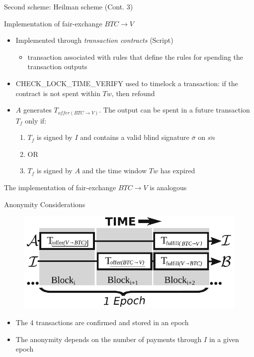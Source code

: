 \documentclass{beamer}
\begin{document}
  
  
  \begin{frame}{Second scheme: Heilman scheme (Cont. 3)}
      \begin{block}{Implementation of fair-exchange $BTC\rightarrow V$}
        \begin{itemize}
            \item Implemented through \emph{transaction contracts} (Script)
            \begin{itemize}
                \item[\MVRightarrow] transaction associated with rules that define the rules for spending the transaction outputs
            \end{itemize}
            \item CHECK\_LOCK\_TIME\_VERIFY used to timelock a transaction: if the contract is not spent within $Tw$, then refound 
            \item $A$ generates $T_{offer(BTC\rightarrow V)}$. The output can be spent in a future transaction $T_f$ only if:
            \begin{enumerate}
                \item $T_f$ is signed by $I$ and contains a valid blind signature $\overline\sigma$ on $\overline{sn}$
                \item[] OR 
                \item $T_f$ is signed by $A$ and the time window $Tw$ has expired
            \end{enumerate}
        \end{itemize}
      \end{block}
      \pause
      
      The implementation of fair-exchange $BTC\rightarrow V$ is analogous
  \end{frame}
  
  
  
  
  
  \begin{frame}{Anonymity Considerations}
      \begin{figure}
          \centering
          \includegraphics[width=0.4\linewidth]{../img/epochs.png}
      \end{figure}
      \begin{itemize}
          \item The 4 transactions are confirmed and stored in an epoch
          \item The anonymity depends on the number of payments through $I$ in a given epoch
      \end{itemize}
  \end{frame}
  
\end{document}
